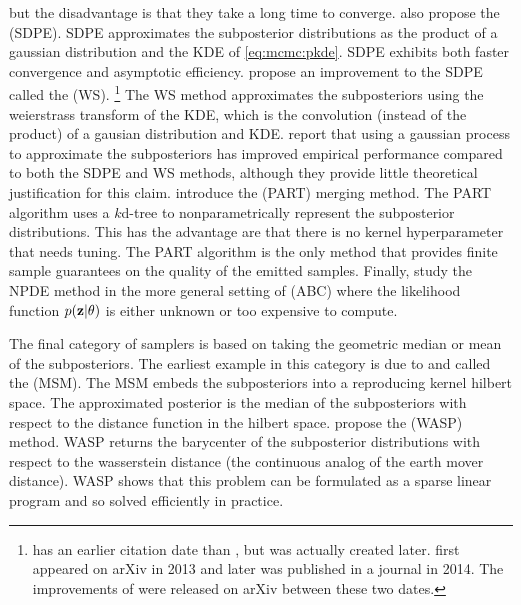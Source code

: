 \documentclass[thesis.tex]{subfiles}
\begin{document}
but the disadvantage is that they take a long time to converge.
\citet{neiswanger2014asymptotically} also propose the  (SDPE). 
SDPE approximates the subposterior distributions as the product of a gaussian distribution and the KDE of \eqref{eq:mcmc:pkde}.
SDPE exhibits both faster convergence and asymptotic efficiency.
\citet{wang2013parallelizing} propose an improvement to the SDPE called the  (WS).%
\footnote{
    \citet{wang2013parallelizing} has an earlier citation date than \citet{neiswanger2014asymptotically}, but was actually created later.
    \citet{neiswanger2014asymptotically} first appeared on arXiv in 2013 and later was published in a journal in 2014.
    The improvements of \citet{wang2013parallelizing} were released on arXiv between these two dates.
}
The WS method approximates the subposteriors using the weierstrass transform of the KDE,
which is the convolution (instead of the product) of a gausian distribution and KDE.
\citet{nemeth2016merging} report that using a gaussian process to approximate the subposteriors has improved empirical performance compared to both the SDPE and WS methods,
although they provide little theoretical justification for this claim.
\citet{wang2015parallelizing} introduce the  (PART) merging method.
The PART algorithm uses a $k$d-tree to nonparametrically represent the subposterior distributions. 
This has the advantage are that there is no kernel hyperparameter that needs tuning.
The PART algorithm is the only method that provides finite sample guarantees on the quality of the emitted samples.
Finally, \citet{white2015piecewise} study the NPDE method in the more general setting of  (ABC) where the likelihood function $p(\mathbf z|\theta)$ is either unknown or too expensive to compute.

The final category of samplers is based on taking the geometric median or mean of the subposteriors.
The earliest example in this category is due to \citet{minsker2014scalable} 
and called the  (MSM).
The MSM embeds the subposteriors into a reproducing kernel hilbert space.
The approximated posterior is the median of the subposteriors with respect to the distance function in the hilbert space.
\citet{srivastava2015wasp} propose the  (WASP) method.
WASP returns the barycenter of the subposterior distributions with respect to the wasserstein distance (the continuous analog of the earth mover distance).
WASP shows that this problem can be formulated as a sparse linear program and so solved efficiently in practice.
\end{document}
